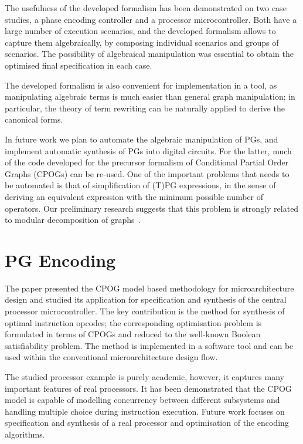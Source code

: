 The usefulness of the developed formalism has been demonstrated on
two case studies, a phase encoding controller and a processor microcontroller.
Both have a large number of execution scenarios, and the developed
formalism allows to capture them algebraically, by composing individual
scenarios and groups of scenarios. The possibility of algebraical
manipulation was essential to obtain the optimised final specification
in each case.

The developed formalism is also convenient for implementation in a
tool, as manipulating algebraic terms is much easier than general
graph manipulation; in particular, the theory of term rewriting can
be naturally applied to derive the canonical forms.

In future work we plan to automate the algebraic manipulation of PGs,
and implement automatic synthesis of PGs into digital circuits. For
the latter, much of the code developed for the precursor formalism
of Conditional Partial Order Graphs (CPOGs) can be re-used. One of
the important problems that needs to be automated is that of simplification
of (T)PG expressions, in the sense of deriving an equivalent expression
with the minimum possible number of operators. Our preliminary research
suggests that this problem is strongly related to modular decomposition
of graphs~\cite{2005_McConnell_modular}.\\

\section{PG Encoding}

The paper presented the CPOG model based methodology for microarchitecture
design and studied its application for specification and synthesis
of the central processor microcontroller. The key contribution is
the method for synthesis of optimal instruction opcodes; the corresponding
optimisation problem is formulated in terms of CPOGs and reduced to
the well-known Boolean satisfiability problem. The method is implemented
in a software tool and can be used within the conventional microarchitecture
design flow.

The studied processor example is purely academic, however, it captures
many important features of real processors. It has been demonstrated
that the CPOG model is capable of modelling concurrency between different
subsystems and handling multiple choice during instruction execution.
Future work focuses on specification and synthesis of a real processor
and optimisation of the encoding algorithms.


